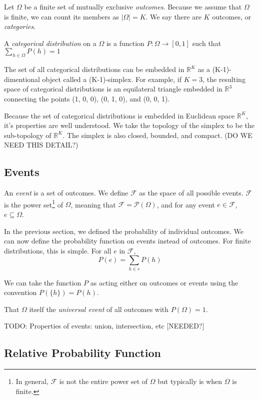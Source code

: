 \documentclass[twoside]{article}
\begin{document}
Let \(\Omega\) be a finite set of mutually exclusive \textit{outcomes}. Because we assume that \(\Omega\) is finite, we can count its members as \(|\Omega| = K\). We say there are \(K\) outcomes, or \textit{categories}.

A \textit{categorical distribution} on a \(\Omega\) is a function \(P: \Omega \rightarrow [0, 1]\) such that \(\sum_{h \in \Omega} P(h) = 1\)

The set of all categorical distributions can be embedded in \(\mathbb{R}^K\) as a (K-1)-dimentional object called a (K-1)-simplex. For example, if \(K = 3\), the resulting space of categorical distributions is an equilateral triangle embedded in \(\mathbb{R}^3\) connecting the points (1, 0, 0), (0, 1, 0), and (0, 0, 1).

Because the set of categorical distributions is embedded in Euclidean space \(\mathbb{R}^K\), it's properties are well understood. We take the topology of the simplex to be the sub-topology of \(\mathbb{R}^K\). The simplex is also closed, bounded, and compact. (DO WE NEED THIS DETAIL?)

\subsection{Events}

An \textit{event} is a set of outcomes. We define \(\mathcal{F}\) as the space of all possible events. \(\mathcal{F}\) is the power set\footnote{In general, \(\mathcal{F}\) is not the entire power set of \(\Omega\) but typically is when \(\Omega\) is finite.} of \(\Omega\), meaning that \(\mathcal{F} = \mathcal{P}(\Omega)\), and for any event \(e \in \mathcal{F}\), \(e \subseteq \Omega\).

In the previous section, we defined the probability of individual outcomes. We can now define the probability function on events instead of outcomes. For finite distributions, this is simple. For all \(e\) in \(\mathcal{F}\),
\[ P(e) = \sum_{h \in e}{P({h})}\]

We can take the function \(P\) as acting either on outcomes or events using the convention \(P(\{h\}) = P(h)\). 

That \(\Omega\) itself the \textit{universal event} of all outcomes with \(P(\Omega) = 1\).

TODO: Properties of events: union, intersection, etc [NEEDED?]

\subsection{Relative Probability Function}
\end{document}
